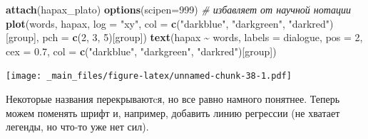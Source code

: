 \documentclass[
]{book}
\newenvironment{Shaded}{\begin{snugshade}}{\end{snugshade}}
\newcommand{\AttributeTok}[1]{\textcolor[rgb]{0.13,0.29,0.53}{#1}}
\newcommand{\CommentTok}[1]{\textcolor[rgb]{0.56,0.35,0.01}{\textit{#1}}}
\newcommand{\DecValTok}[1]{\textcolor[rgb]{0.00,0.00,0.81}{#1}}
\newcommand{\FloatTok}[1]{\textcolor[rgb]{0.00,0.00,0.81}{#1}}
\newcommand{\FunctionTok}[1]{\textcolor[rgb]{0.13,0.29,0.53}{\textbf{#1}}}
\newcommand{\NormalTok}[1]{#1}
\newcommand{\SpecialCharTok}[1]{\textcolor[rgb]{0.81,0.36,0.00}{\textbf{#1}}}
\newcommand{\StringTok}[1]{\textcolor[rgb]{0.31,0.60,0.02}{#1}}
\theoremstyle{definition}
\theoremstyle{definition}
\theoremstyle{definition}
\theoremstyle{definition}
\theoremstyle{remark}
\begin{document}
\begin{Shaded}
\begin{Highlighting}[]
\FunctionTok{attach}\NormalTok{(hapax\_plato)}
\FunctionTok{options}\NormalTok{(}\AttributeTok{scipen=}\DecValTok{999}\NormalTok{) }\CommentTok{\# избавляет от научной нотации}
\FunctionTok{plot}\NormalTok{(words, hapax, }\AttributeTok{log =} \StringTok{"xy"}\NormalTok{, }\AttributeTok{col =} \FunctionTok{c}\NormalTok{(}\StringTok{"darkblue"}\NormalTok{, }\StringTok{"darkgreen"}\NormalTok{, }\StringTok{"darkred"}\NormalTok{)[group], }
     \AttributeTok{pch =} \FunctionTok{c}\NormalTok{(}\DecValTok{2}\NormalTok{, }\DecValTok{3}\NormalTok{, }\DecValTok{5}\NormalTok{)[group])}
\FunctionTok{text}\NormalTok{(hapax }\SpecialCharTok{\textasciitilde{}}\NormalTok{ words, }\AttributeTok{labels =}\NormalTok{ dialogue, }
     \AttributeTok{pos =} \DecValTok{2}\NormalTok{, }\AttributeTok{cex =} \FloatTok{0.7}\NormalTok{, }\AttributeTok{col =} \FunctionTok{c}\NormalTok{(}\StringTok{"darkblue"}\NormalTok{, }\StringTok{"darkgreen"}\NormalTok{, }\StringTok{"darkred"}\NormalTok{)[group])}
\end{Highlighting}
\end{Shaded}

\texttt{[image: \_main\_files/figure-latex/unnamed-chunk-38-1.pdf]}

Некоторые названия перекрываютcя, но все равно намного понятнее. Теперь можем поменять шрифт и, например, добавить линию регрессии (не хватает легенды, но что-то уже нет сил).
\end{document}
